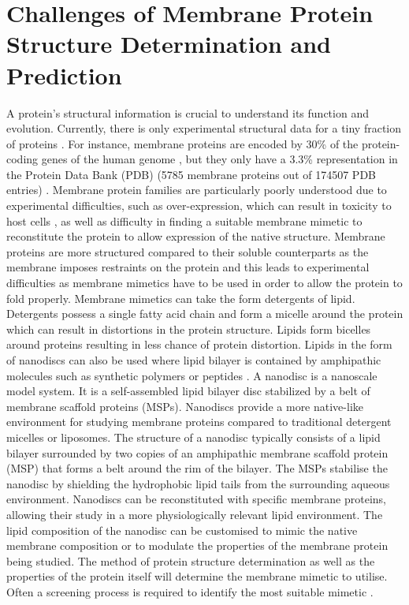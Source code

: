 \section{Challenges of Membrane Protein Structure Determination and Prediction}
A protein’s structural information is crucial to understand its function and evolution. Currently, there is only experimental structural data for a tiny fraction of proteins \cite{Khafizov2014}. For instance, membrane proteins are encoded by 30\% of the protein-coding genes of the human genome \cite{Almen2009}, but they only have a 3.3\% \cite{mesdaghi2020silico}
representation in the Protein Data Bank (PDB) (5785 membrane proteins out of 174507 PDB entries) \cite{mesdaghi2020silico}. Membrane protein families are particularly poorly understood due to experimental difficulties, such as over-expression, which can result in toxicity to host cells \cite{Grisshammer1995}, as well as difficulty in finding a suitable membrane mimetic to reconstitute the protein to allow expression of the native structure.  Membrane proteins are more structured compared to their soluble counterparts as the membrane imposes restraints on the protein \cite{leman2020macromolecular} and this leads to experimental difficulties as membrane mimetics have to be used in order to allow the protein to fold properly.  Membrane mimetics can take the form detergents of lipid.  Detergents possess a single fatty acid chain and form a micelle around the protein which can result in distortions in the protein structure.  Lipids form bicelles around proteins resulting in less chance of protein distortion. Lipids in the form of nanodiscs can also be used where lipid bilayer is contained by amphipathic molecules such as synthetic polymers or peptides \cite{denisov2016nanodiscs}.  A nanodisc is a nanoscale model system. It is a self-assembled lipid bilayer disc stabilized by a belt of membrane scaffold proteins (MSPs). Nanodiscs provide a more native-like environment for studying membrane proteins compared to traditional detergent micelles or liposomes.  The structure of a nanodisc typically consists of a lipid bilayer surrounded by two copies of an amphipathic membrane scaffold protein (MSP) that forms a belt around the rim of the bilayer. The MSPs stabilise the nanodisc by shielding the hydrophobic lipid tails from the surrounding aqueous environment.  Nanodiscs can be reconstituted with specific membrane proteins, allowing their study in a more physiologically relevant lipid environment. The lipid composition of the nanodisc can be customised to mimic the native membrane composition or to modulate the properties of the membrane protein being studied.  The method of protein structure determination as well as the properties of the protein itself  will determine the membrane mimetic to utilise.  Often a screening process is required to identify the most suitable mimetic \cite{bayburt2010membrane}. 

